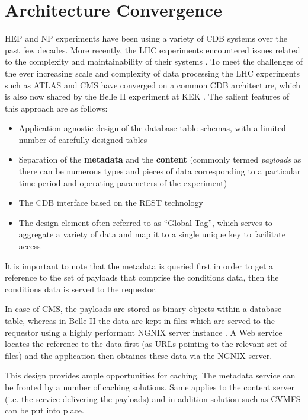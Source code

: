 \documentclass[pdftex,12pt,letter]{article}
\begin{document}
\section{Architecture Convergence}

HEP and NP experiments have been using a variety of CDB systems over the past few decades.
More recently, the LHC experiments encountered issues related to the complexity and
maintainability of their systems \cite{func_test}. To meet the challenges of the ever increasing scale
and complexity of data processing the LHC experiments such as ATLAS and CMS have converged on
a common CDB architecture, which is also now shared by the Belle II experiment at KEK \cite{b2cdb}.
The salient features of this approach are as follows:
\begin{itemize}

\item Application-agnostic design of the database table schemas, with a limited number of
carefully designed tables

\item Separation of the \textbf{metadata} and the \textbf{content}
(commonly termed \textit{payloads} as there can be numerous types and pieces of data corresponding
to a particular time period and operating parameters of the experiment)

\item The CDB interface based on the REST technology

\item The design element often referred to as ``Global Tag'', which serves to aggregate a variety
of data and map it to a single unique key to facilitate access

\end{itemize}


\noindent  It is important to note that  the metadata is queried first in order to get a reference to the
set of payloads that comprise the conditions data, then the conditions data is served to the requestor.

In case of CMS, the payloads are stored as binary objects within a database table, whereas in Belle II
the data are kept in files which are served to the requestor using a highly performant NGNIX server instance
\cite{nginx}. A Web service locates the reference to the data first (as URLs pointing to the relevant set of files)
and the application then obtaines these data via the NGNIX server.

This design provides ample opportunities for caching. The metadata service can be fronted by a number
of caching solutions. Same applies to the content server (i.e. the service delivering the payloads) and in
addition solution such as CVMFS can be put into place.
\end{document}

